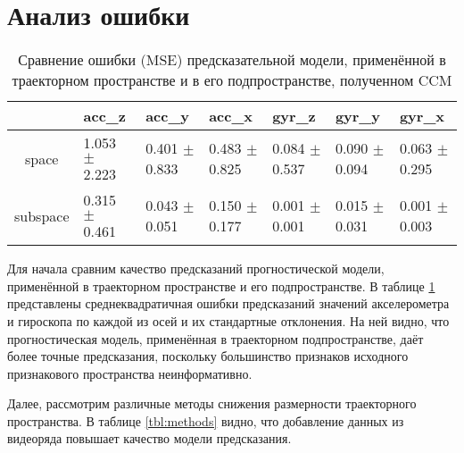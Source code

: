 \documentclass[a4paper, 12pt]{article}
\begin{document}
\begin{figure}[bhtp]
	\centering
	\label{fig:video_data}
\end{figure}

\section{Анализ ошибки}
\begin{table}[bhtp]
	\fontsize{10pt}{14pt}
	\selectfont
	\centering
	\caption{Сравнение ошибки (MSE) предсказательной модели, применённой в траекторном пространстве и в его подпространстве, полученном CCM}
	\label{tbl:space_and_subspace}
	\begin{tabularx}{\textwidth}{c|XXXXXX}
		\hline
		& acc\_z & acc\_y & acc\_x & gyr\_z & gyr\_y & gyr\_x \\
		\hline
		space & 1.053 $\pm$ 2.223 & 0.401 $\pm$ 0.833 & 0.483 $\pm$ 0.825 & 0.084 $\pm$ 0.537 & 0.090 $\pm$ 0.094 & 0.063 $\pm$ 0.295 \\
		subspace & 0.315 $\pm$ 0.461 & 0.043 $\pm$ 0.051 & 0.150 $\pm$ 0.177 & 0.001 $\pm$ 0.001	& 0.015 $\pm$ 0.031 & 0.001 $\pm$ 0.003 \\
		\hline
	\end{tabularx}
\end{table}

Для начала сравним качество предсказаний прогностической модели, применённой в траекторном пространстве и его подпространстве.
В таблице \ref{tbl:space_and_subspace} представлены среднеквадратичная ошибки предсказаний значений акселерометра и гироскопа по каждой из осей и их стандартные отклонения. 
На ней видно, что прогностическая модель, применённая в траекторном подпространстве, даёт более точные предсказания, поскольку большинство признаков исходного признакового пространства неинформативно.

Далее, рассмотрим различные методы снижения размерности траекторного пространства. В таблице \ref{tbl:methods} видно, что добавление данных из видеоряда повышает качество модели предсказания.
\end{document}
